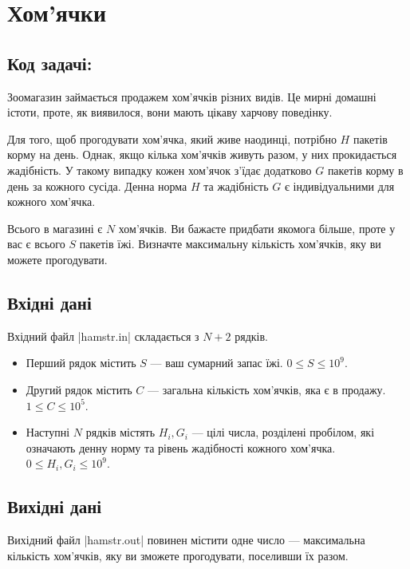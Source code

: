 \documentclass[12pt,a4paper]{article}
\begin{document}
\section*{Хом’ячки \hfill {}}


\subsection*{Код задачі: }

Зоомагазин займається продажем хом’ячків різних видів. Це мирні домашні істоти, проте, як виявилося, вони мають цікаву харчову поведінку.

Для того, щоб прогодувати хом’ячка, який живе наодинці, потрібно \(H\) пакетів корму на день. Однак, якщо кілька хом’ячків живуть разом, у них прокидається жадібність. У такому випадку кожен хом’ячок з’їдає додатково \(G\) пакетів корму в день за кожного сусіда. Денна норма \(H\) та жадібність \(G\) є індивідуальними для кожного хом’ячка.

Всього в магазині є \(N\) хом’ячків. Ви бажаєте придбати якомога більше, проте у вас є всього \(S\) пакетів їжі. Визначте максимальну кількість хом’ячків, яку ви можете прогодувати.


\subsection*{Вхідні дані}

Вхідний файл |hamstr.in| складається з \(N + 2\) рядків.

\begin{itemize}
    \item Перший рядок містить \(S\) --- ваш сумарний запас їжі. \(0 \leq S \leq 10^9 \).
    \item Другий рядок містить \(C\) --- загальна кількість хом’ячків, яка є в продажу. \(1 \leq C \leq 10^5 \).
    \item Наступні \(N\) рядків містять \(H_i, G_i\) --- цілі числа, розділені пробілом, які означають денну норму та рівень жадібності кожного хом’ячка. \(0 \leq H_i, G_i \leq 10^9 \).
\end{itemize}


\subsection*{Вихідні дані}

Вихідний файл |hamstr.out| повинен містити одне число --- максимальна кількість хом’ячків, яку ви зможете прогодувати, поселивши їх разом.
\end{document}
